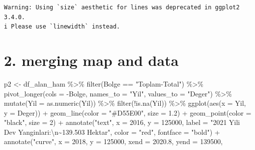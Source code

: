 \documentclass[
  11pt,
  a4paper,
  DIV=11,
  numbers=noendperiod]{scrartcl}
\newenvironment{Shaded}{\begin{snugshade}}{\end{snugshade}}
\newcommand{\AttributeTok}[1]{\textcolor[rgb]{0.40,0.45,0.13}{#1}}
\newcommand{\DecValTok}[1]{\textcolor[rgb]{0.68,0.00,0.00}{#1}}
\newcommand{\FloatTok}[1]{\textcolor[rgb]{0.68,0.00,0.00}{#1}}
\newcommand{\FunctionTok}[1]{\textcolor[rgb]{0.28,0.35,0.67}{#1}}
\newcommand{\NormalTok}[1]{\textcolor[rgb]{0.00,0.23,0.31}{#1}}
\newcommand{\OtherTok}[1]{\textcolor[rgb]{0.00,0.23,0.31}{#1}}
\newcommand{\SpecialCharTok}[1]{\textcolor[rgb]{0.37,0.37,0.37}{#1}}
\newcommand{\StringTok}[1]{\textcolor[rgb]{0.13,0.47,0.30}{#1}}
\begin{document}
\begin{verbatim}
Warning: Using `size` aesthetic for lines was deprecated in ggplot2 3.4.0.
i Please use `linewidth` instead.
\end{verbatim}

\section{2. merging map and data}\label{merging-map-and-data}

\begin{Shaded}
\begin{Highlighting}[]
\NormalTok{p2 }\OtherTok{\textless{}{-}}\NormalTok{ df\_alan\_ham }\SpecialCharTok{\%\textgreater{}\%}
  \FunctionTok{filter}\NormalTok{(Bolge }\SpecialCharTok{==} \StringTok{"Toplam{-}Total"}\NormalTok{) }\SpecialCharTok{\%\textgreater{}\%}
  \FunctionTok{pivot\_longer}\NormalTok{(}\AttributeTok{cols =} \SpecialCharTok{{-}}\NormalTok{Bolge, }\AttributeTok{names\_to =} \StringTok{"Yil"}\NormalTok{, }\AttributeTok{values\_to =} \StringTok{"Deger"}\NormalTok{) }\SpecialCharTok{\%\textgreater{}\%}
  \FunctionTok{mutate}\NormalTok{(}\AttributeTok{Yil =} \FunctionTok{as.numeric}\NormalTok{(Yil)) }\SpecialCharTok{\%\textgreater{}\%}
  \FunctionTok{filter}\NormalTok{(}\SpecialCharTok{!}\FunctionTok{is.na}\NormalTok{(Yil)) }\SpecialCharTok{\%\textgreater{}\%}
  \FunctionTok{ggplot}\NormalTok{(}\FunctionTok{aes}\NormalTok{(}\AttributeTok{x =}\NormalTok{ Yil, }\AttributeTok{y =}\NormalTok{ Deger)) }\SpecialCharTok{+}
  \FunctionTok{geom\_line}\NormalTok{(}\AttributeTok{color =} \StringTok{"\#D55E00"}\NormalTok{, }\AttributeTok{size =} \FloatTok{1.2}\NormalTok{) }\SpecialCharTok{+}
  \FunctionTok{geom\_point}\NormalTok{(}\AttributeTok{color =} \StringTok{"black"}\NormalTok{, }\AttributeTok{size =} \DecValTok{2}\NormalTok{) }\SpecialCharTok{+}
  \FunctionTok{annotate}\NormalTok{(}\StringTok{"text"}\NormalTok{, }\AttributeTok{x =} \DecValTok{2016}\NormalTok{, }\AttributeTok{y =} \DecValTok{125000}\NormalTok{, }\AttributeTok{label =} \StringTok{"2021 Yili Dev Yanginlari:}\SpecialCharTok{\textbackslash{}n}\StringTok{\textasciitilde{}139.503 Hektar"}\NormalTok{, }\AttributeTok{color =} \StringTok{"red"}\NormalTok{, }\AttributeTok{fontface =} \StringTok{"bold"}\NormalTok{) }\SpecialCharTok{+}
  \FunctionTok{annotate}\NormalTok{(}\StringTok{"curve"}\NormalTok{, }\AttributeTok{x =} \DecValTok{2018}\NormalTok{, }\AttributeTok{y =} \DecValTok{125000}\NormalTok{, }\AttributeTok{xend =} \FloatTok{2020.8}\NormalTok{, }\AttributeTok{yend =} \DecValTok{139500}\NormalTok{, }

\end{Highlighting}
\end{Shaded}
\end{document}
